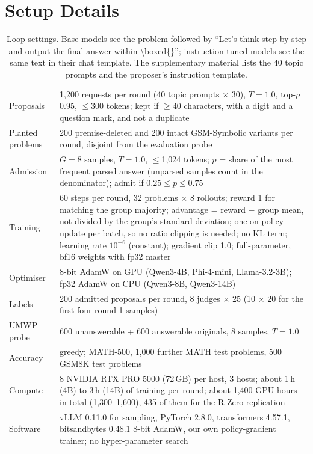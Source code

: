 \FloatBarrier
\section{Setup Details}
\label{app:setup}

\begin{table}[htbp]
\centering
\small
\setlength{\tabcolsep}{3pt}
\begin{tabular}{p{}p{}}
\toprule
Proposals & 1,200 requests per round (40 topic prompts $\times$ 30), $T{=}1.0$, top-$p$ 0.95, $\le$300 tokens; kept if $\ge$40 characters, with a digit and a question mark, and not a duplicate \\
Planted problems & 200 premise-deleted and 200 intact GSM-Symbolic variants per round, disjoint from the evaluation probe \\
Admission & $G{=}8$ samples, $T{=}1.0$, $\le$1,024 tokens; $p$ = share of the most frequent parsed answer (unparsed samples count in the denominator); admit if $0.25 \le p \le 0.75$ \\
Training & 60 steps per round, 32 problems $\times$ 8 rollouts; reward 1 for matching the group majority; advantage = reward $-$ group mean, not divided by the group's standard deviation; one on-policy update per batch, so no ratio clipping is needed; no KL term; learning rate $10^{-6}$ (constant); gradient clip 1.0; full-parameter, bf16 weights with fp32 master \\
Optimiser & 8-bit AdamW on GPU (Qwen3-4B, Phi-4-mini, Llama-3.2-3B); fp32 AdamW on CPU (Qwen3-8B, Qwen3-14B) \\
Labels & 200 admitted proposals per round, 8 judges $\times$ 25 (10 $\times$ 20 for the first four round-1 samples) \\
UMWP probe & 600 unanswerable + 600 answerable originals, 8 samples, $T{=}1.0$ \\
Accuracy & greedy; MATH-500, 1,000 further MATH test problems, 500 GSM8K test problems \\
Compute & 8 NVIDIA RTX PRO 5000 (72\,GB) per host, 3 hosts; about 1\,h (4B) to 3\,h (14B) of training per round; about 1,400 GPU-hours in total (1,300--1,600), 435 of them for the R-Zero replication \\
Software & vLLM 0.11.0 \citep{kwon2023vllm} for sampling, PyTorch 2.8.0, transformers 4.57.1, bitsandbytes 0.48.1 8-bit AdamW, our own policy-gradient trainer; no hyper-parameter search \\
\bottomrule
\end{tabular}
\caption{Loop settings. Base models see the problem followed by ``Let's think step by step and output the final answer within \textbackslash boxed\{\}''; instruction-tuned models see the same text in their chat template. The supplementary material lists the 40 topic prompts and the proposer's instruction template.}
\label{tab:hparams}
\end{table}

